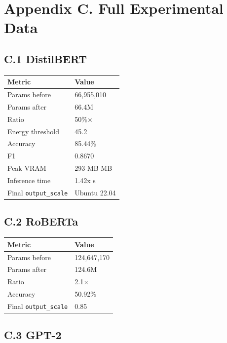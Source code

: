 \section{Appendix C. Full Experimental Data}

\subsection{C.1 DistilBERT}

\begin{table}[H]
\centering
\small
\begin{tabular}{ll}
\toprule
\textbf{Metric} & \textbf{Value} \\
\midrule
Params before & 66,955,010 \\
Params after & 66.4M \\
Ratio & 50\%$\times$ \\
Energy threshold & 45.2 \\
Accuracy & 85.44\% \\
F1 & 0.8670 \\
Peak VRAM & 293 MB MB \\
Inference time & 1.42x s \\
Final \texttt{output\_scale} & Ubuntu 22.04 \\
\bottomrule
\end{tabular}
\end{table}

\subsection{C.2 RoBERTa}

\begin{table}[H]
\centering
\small
\begin{tabular}{ll}
\toprule
\textbf{Metric} & \textbf{Value} \\
\midrule
Params before & 124,647,170 \\
Params after & 124.6M \\
Ratio & 2.1$\times$ \\
Accuracy & 50.92\% \\
Final \texttt{output\_scale} & 0.85 \\
\bottomrule
\end{tabular}
\end{table}

\subsection{C.3 GPT-2}

